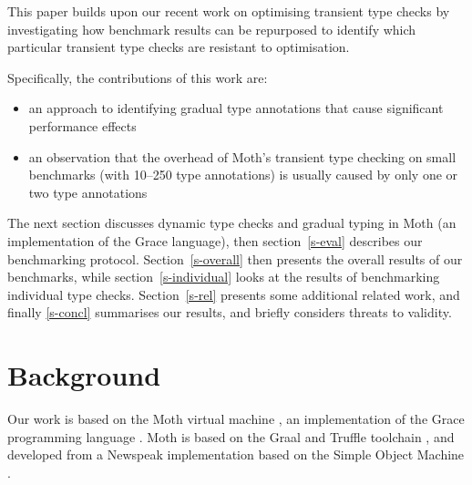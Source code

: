 \documentclass[sigplan,10pt,review,screen]{acmart}\settopmatter{printfolios=true}
\begin{document}
This paper builds upon our recent work on optimising transient
type checks \cite{Roberts2017,roberts-and-co-ecoop-2019} by
investigating how benchmark results can be repurposed to identify which
particular transient type checks are resistant to optimisation.

Specifically, the contributions of this work are:

\begin{itemize}
  \item an approach to identifying gradual type annotations
        that cause significant performance effects
  \item an observation that the overhead of Moth's transient type checking on small benchmarks (with 10--250 type annotations) is usually caused by only one or two type annotations
\end{itemize}


The next section discusses dynamic type checks and gradual typing in
Moth (an implementation of the Grace language), then section~\ref{s-eval} describes our benchmarking protocol. Section~\ref{s-overall} then presents the overall results of
our benchmarks, while section~\ref{s-individual}
looks at the results of benchmarking individual type checks.
Section~\ref{s-rel} presents some additional related work, and finally \ref{s-concl} summarises our results, and briefly considers threats to validity.

\section{Background}
\label{s-bg}

Our work is based on the Moth virtual machine 
\cite{Roberts2017,roberts-and-co-ecoop-2019},
an implementation
of the Grace programming language 
\citep{graceOnward12,graceSigcse13}.
Moth is based on the Graal and Truffle toolchain
\cite{Wurthinger:2017:PPE,Wurthinger2013},
and developed from a Newspeak implementation based on the  Simple
Object Machine \cite{Daloze2016,SOMns}.
\end{document}
